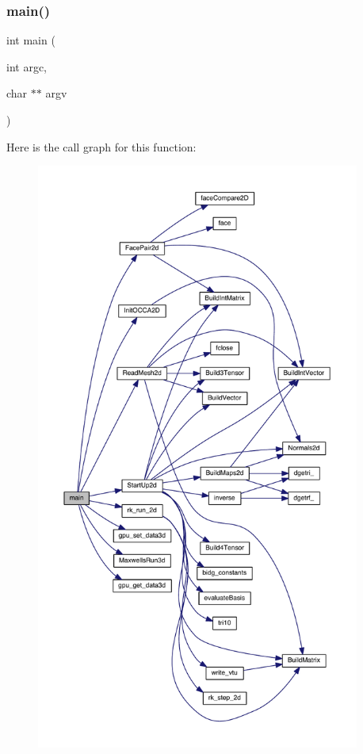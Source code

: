 \subsubsection{\texorpdfstring{main()}{main()}}
{\footnotesize\ttfamily int main (\begin{DoxyParamCaption}\item[{int}]{argc,  }\item[{char $\ast$$\ast$}]{argv }\end{DoxyParamCaption})}

Here is the call graph for this function\+:\nopagebreak
\begin{figure}[H]
\begin{center}
\leavevmode
\includegraphics[height=550pt]{a00566_a3c04138a5bfe5d72780bb7e82a18e627_cgraph}
\end{center}
\end{figure}
